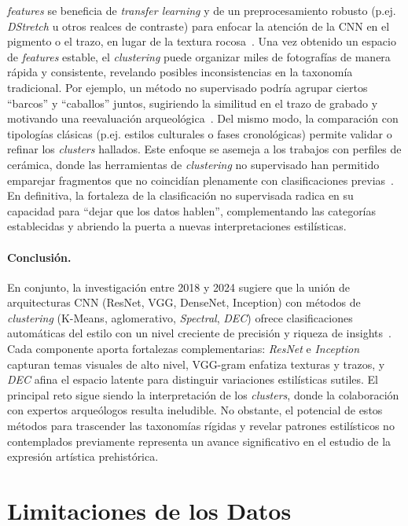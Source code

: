 \textit{features} se beneficia de \textit{transfer learning} y de un preprocesamiento robusto (p.ej. \textit{DStretch} u otros realces de contraste) para enfocar la atención de la CNN en el pigmento o el trazo, en lugar de la textura rocosa~\cite{guerin2018}. Una vez obtenido un espacio de \textit{features} estable, el \textit{clustering} puede organizar miles de fotografías de manera rápida y consistente, revelando posibles inconsistencias en la taxonomía tradicional. Por ejemplo, un método no supervisado podría agrupar ciertos “barcos” y “caballos” juntos, sugiriendo la similitud en el trazo de grabado y motivando una reevaluación arqueológica~\cite{gairola2020}. Del mismo modo, la comparación con tipologías clásicas (p.ej. estilos culturales o fases cronológicas) permite validar o refinar los \textit{clusters} hallados. Este enfoque se asemeja a los trabajos con perfiles de cerámica, donde las herramientas de \textit{clustering} no supervisado han permitido emparejar fragmentos que no coincidían plenamente con clasificaciones previas~\cite{parisotto2022}. En definitiva, la fortaleza de la clasificación no supervisada radica en su capacidad para “dejar que los datos hablen”, complementando las categorías establecidas y abriendo la puerta a nuevas interpretaciones estilísticas. \paragraph{Conclusión.} En conjunto, la investigación entre 2018 y 2024 sugiere que la unión de arquitecturas CNN (ResNet, VGG, DenseNet, Inception) con métodos de \textit{clustering} (K-Means, aglomerativo, \textit{Spectral}, \textit{DEC}) ofrece clasificaciones automáticas del estilo con un nivel creciente de precisión y riqueza de insights~\cite{parisotto2022,castellano2022,dangeti2024}. Cada componente aporta fortalezas complementarias: \textit{ResNet} e \textit{Inception} capturan temas visuales de alto nivel, VGG-gram enfatiza texturas y trazos, y \textit{DEC} afina el espacio latente para distinguir variaciones estilísticas sutiles. El principal reto sigue siendo la interpretación de los \textit{clusters}, donde la colaboración con expertos arqueólogos resulta ineludible. No obstante, el potencial de estos métodos para trascender las taxonomías rígidas y revelar patrones estilísticos no contemplados previamente representa un avance significativo en el estudio de la expresión artística prehistórica.

\section{Limitaciones de los Datos}

